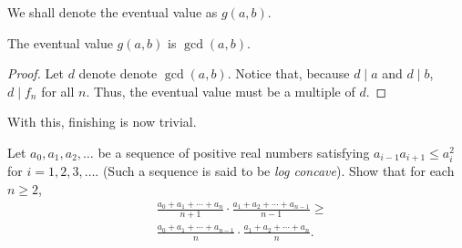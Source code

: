 \documentclass[a4paper, 10pt]{article}
\begin{document}
\begin{solution}
    We shall denote the eventual value as \( g(a, b) \).
    \begin{claim}
        The eventual value \( g(a, b) \) is \( \gcd{(a, b)} \).
    \end{claim}
    \begin{proof}
        Let \( d \) denote denote \( \gcd{(a, b)} \). Notice that, because \( d
        \mid a \) and \( d \mid b \), \( d \mid f_n \) for all \( n \). Thus,
        the eventual value must be a multiple of \( d \).
    \end{proof}
    With this, finishing is now trivial.
\end{solution}

\begin{chirpbox}
\begin{problemnum}
    Let \( a_0, a_1, a_2, \ldots \) be a sequence of positive real numbers satisfying \( a_{i-1} a_{i+1} \le a_i^2 \) for \( i = 1, 2, 3, \ldots \). (Such a sequence is said to be \textit{log concave}). Show that for each \( n \ge 2 \),
    \begin{align*}
        &\frac{a_0 + a_1 + \cdots + a_n}{n+1} \cdot \frac{a_1 + a_2 + \cdots + a_{n-1}}{n-1} \ge \\
        &\frac{a_0 + a_1 + \cdots + a_{n-1}}{n} \cdot \frac{a_1 + a_2 + \cdots + a_n}{n}
    .\end{align*}
\end{problemnum}
\end{chirpbox}
\end{document}
